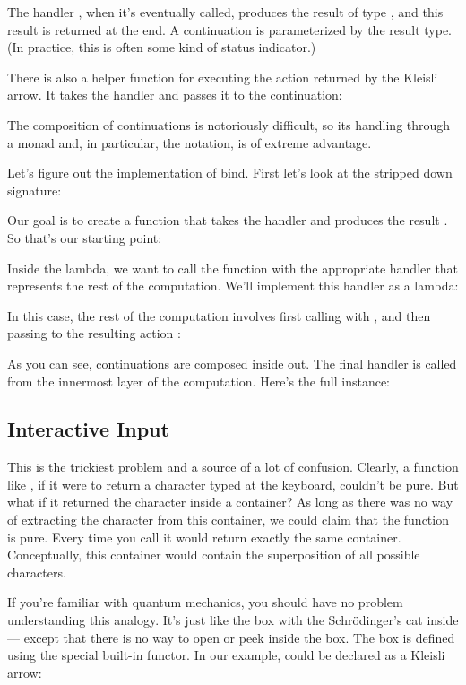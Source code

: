 The handler , when it's eventually called,
produces the result of type , and this result is returned at
the end. A continuation is parameterized by the result type. (In
practice, this is often some kind of status indicator.)

There is also a helper function for executing the action returned by the
Kleisli arrow. It takes the handler and passes it to the continuation:

The composition of continuations is notoriously difficult, so its
handling through a monad and, in particular, the  notation,
is of extreme advantage.

Let's figure out the implementation of bind. First let's look at the
stripped down signature:

Our goal is to create a function that takes the handler
 and produces the result . So
that's our starting point:

Inside the lambda, we want to call the function  with the
appropriate handler that represents the rest of the computation. We'll
implement this handler as a lambda:

In this case, the rest of the computation involves first calling
 with , and then passing  to the
resulting action :

As you can see, continuations are composed inside out. The final handler
 is called from the innermost layer of the computation.
Here's the full instance:


\subsection{Interactive Input}

This is the trickiest problem and a source of a lot of confusion.
Clearly, a function like , if it were to return a
character typed at the keyboard, couldn't be pure. But what if it
returned the character inside a container? As long as there was no way
of extracting the character from this container, we could claim that the
function is pure. Every time you call  it would return
exactly the same container. Conceptually, this container would contain
the superposition of all possible characters.

If you're familiar with quantum mechanics, you should have no problem
understanding this analogy. It's just like the box with the
Schrödinger's cat inside --- except that there is no way to open or peek
inside the box. The box is defined using the special built-in
 functor. In our example,  could be declared
as a Kleisli arrow:

